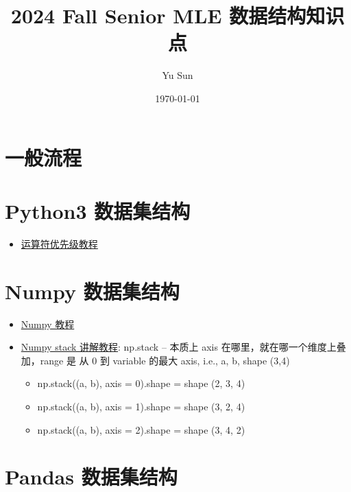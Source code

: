 \documentclass[12pt]{article}
\numberwithin{theorem}{section} %
\numberwithin{definition}{section} %
\numberwithin{assumption}{section} %
\numberwithin{lemma}{section} %
\numberwithin{remark}{section} %
\numberwithin{prop}{section} %
\numberwithin{corollary}{section} %
\numberwithin{example}{section} %
\numberwithin{question}{section} %
\numberwithin{problem}{section} %
\numberwithin{conjecture}{section} %
\numberwithin{append}{section} %
\numberwithin{property}{section} %
\begin{document}
	\begin{CJK}{UTF8}{gbsn}  
	\title{2024  Fall Senior  MLE   数据结构知识点}
	\author{Yu Sun}
	
	
	\date{\today}
	\maketitle
	\vspace{-1em}
	

		
		
		\setcounter{section}{0}
		\section{一般流程}
		\section{Python3 数据集结构}
		\begin{itemize}
			\item\href{https://cloud.tencent.com/developer/article/1907505}{运算符优先级教程}
		\end{itemize}
		\section{Numpy 数据集结构}
		\begin{itemize}
			 \item\href{https://www.runoob.com/numpy/numpy-ndarray-object.html}{Numpy 教程}
			 \item  \href{https://blog.csdn.net/qq_17550379/article/details/78934529}{Numpy stack 讲解教程}: np.stack -- 本质上 axis 在哪里，就在哪一个维度上叠加，range 是 从 0 到 variable 的最大 axis, i.e., a, b, shape (3,4)
			 \begin{itemize}
			 	\item np.stack((a, b), axis = 0).shape =  shape (2, 3, 4)
			 	\item np.stack((a, b), axis = 1).shape =  shape (3, 2, 4)
			 	\item np.stack((a, b), axis = 2).shape =  shape (3, 4, 2)
			 \end{itemize}
		\end{itemize}
		
		\section{Pandas 数据集结构}		
		
	\end{CJK}  
\end{document}
